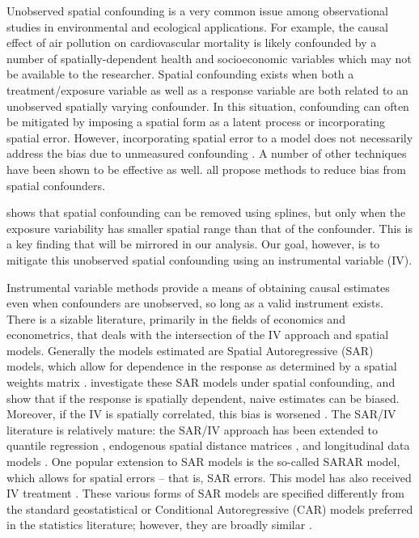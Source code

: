\documentclass[12pt]{article}
\begin{document}
Unobserved spatial confounding is a very common issue among observational studies in environmental and ecological applications. For example, the causal effect of air pollution on cardiovascular mortality is likely confounded by a number of spatially-dependent health and socioeconomic variables which may not be available to the researcher. Spatial confounding exists when both a treatment/exposure variable as well as a response variable are both related to an unobserved spatially varying confounder. In this situation, confounding can often be mitigated by imposing a spatial form as a latent process or incorporating spatial error. However, incorporating spatial error to a model does not necessarily address the bias due to unmeasured confounding \citep{hodges2010adding,reich2020review}. A number of other techniques have been shown to be effective as well. \cite{papadogeorgou2019adjusting,keller2020selecting, davis2019addressing, schnell2019mitigating, thaden2018structural, jarner2002estimation} all propose methods to reduce bias from spatial confounders.  

\cite{paciorek2010importance} shows that spatial confounding can be removed using splines, but only when the exposure variability has smaller spatial range than that of the confounder. This is a key finding that will be mirrored in our analysis. Our goal, however, is to mitigate this unobserved spatial confounding using an instrumental variable (IV). 

Instrumental variable methods provide a means of obtaining causal estimates even when confounders are unobserved, so long as a valid instrument exists. There is a sizable literature, primarily in the fields of economics and econometrics, that deals with the intersection of the IV approach and spatial models. Generally the models estimated are Spatial Autoregressive (SAR) models, which allow for dependence in the response as determined by a spatial weights matrix \citep{kelejian2004instrumental}. \cite{betz2017spatial} investigate these SAR models under spatial confounding, and show that if the response is spatially dependent, naive estimates can be biased. Moreover, if the IV is spatially correlated, this bias is worsened \citep{betz2017spatial}. The SAR/IV literature is relatively mature: the SAR/IV approach has been extended to quantile regression \citep{su2007instrumental}, endogenous spatial distance matrices \citep{qu2015estimating}, and longitudinal data models \citep{kelejian2014estimation, qu2016instrumental}. One popular extension to SAR models is the so-called SARAR model, which allows for spatial errors -- that is, SAR errors. This model has also received IV treatment \citep{kelejian1998generalized,kelejian2004instrumental, piras2010sphet, lee2003best}.  These various forms of SAR models are specified differently from the standard geostatistical or Conditional Autoregressive (CAR) models preferred in the statistics literature; however, they are broadly similar \citep{ver2018relationship}. 
\end{document}

